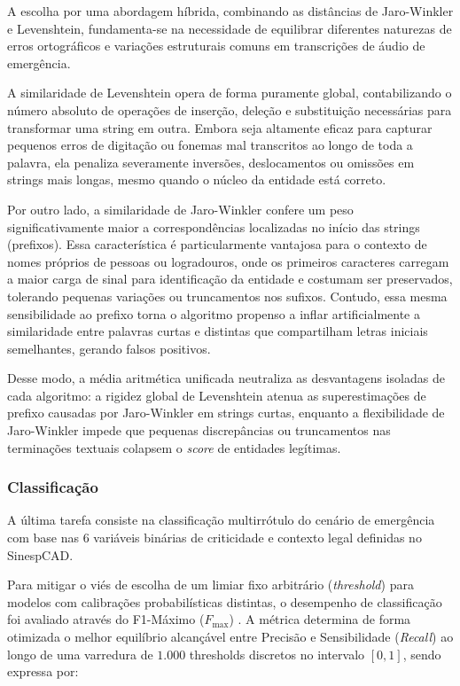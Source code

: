 \documentclass{IEEEphot}
\begin{document}
A escolha por uma abordagem híbrida, combinando as distâncias de Jaro-Winkler e Levenshtein, fundamenta-se na necessidade de equilibrar diferentes naturezas de erros ortográficos e variações estruturais comuns em transcrições de áudio de emergência.

A similaridade de Levenshtein opera de forma puramente global, contabilizando o número absoluto de operações de inserção, deleção e substituição necessárias para transformar uma string em outra. Embora seja altamente eficaz para capturar pequenos erros de digitação ou fonemas mal transcritos ao longo de toda a palavra, ela penaliza severamente inversões, deslocamentos ou omissões em strings mais longas, mesmo quando o núcleo da entidade está correto.

Por outro lado, a similaridade de Jaro-Winkler confere um peso significativamente maior a correspondências localizadas no início das strings (prefixos). Essa característica é particularmente vantajosa para o contexto de nomes próprios de pessoas ou logradouros, onde os primeiros caracteres carregam a maior carga de sinal para identificação da entidade e costumam ser preservados, tolerando pequenas variações ou truncamentos nos sufixos. Contudo, essa mesma sensibilidade ao prefixo torna o algoritmo propenso a inflar artificialmente a similaridade entre palavras curtas e distintas que compartilham letras iniciais semelhantes, gerando falsos positivos.

Desse modo, a média aritmética unificada neutraliza as desvantagens isoladas de cada algoritmo: a rigidez global de Levenshtein atenua as superestimações de prefixo causadas por Jaro-Winkler em strings curtas, enquanto a flexibilidade de Jaro-Winkler impede que pequenas discrepâncias ou truncamentos nas terminações textuais colapsem o \textit{score} de entidades legítimas.

\subsubsection{Classificação}

A última tarefa consiste na classificação multirrótulo do cenário de emergência com base nas 6 variáveis binárias de criticidade e contexto legal definidas no SinespCAD.

Para mitigar o viés de escolha de um limiar fixo arbitrário (\textit{threshold}) para modelos com calibrações probabilísticas distintas, o desempenho de classificação foi avaliado através do F1-Máximo ($F_{\text{max}}$) \cite{jiang2016expanded}. A métrica determina de forma otimizada o melhor equilíbrio alcançável entre Precisão e Sensibilidade (\textit{Recall}) ao longo de uma varredura de $1.000$ thresholds discretos no intervalo $[0, 1]$, sendo expressa por:
\end{document}
